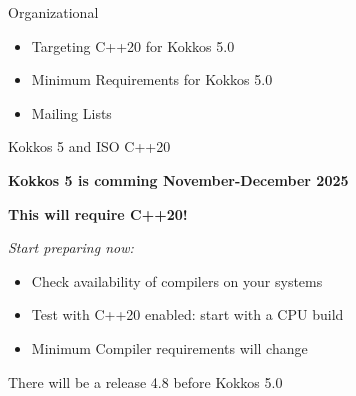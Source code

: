

\begin{frame}[fragile]

  {\Huge Organizational}

  \vspace{15pt}

  \begin{itemize}
    \item Targeting C++20 for Kokkos 5.0
    \item Minimum Requirements for Kokkos 5.0
    \item Mailing Lists
  \end{itemize}

\end{frame}


\begin{frame}[fragile]{Kokkos 5 and ISO C++20}
\begin{center}
\textbf{Kokkos 5 is comming November-December 2025}

\vspace{0.5cm}
\textbf{This will require C++20!}
\end{center}

\textit{Start preparing now:}
\begin{itemize}
  \item{Check availability of compilers on your systems}
  \item{Test with C++20 enabled: start with a CPU build}
  \item{Minimum Compiler requirements will change}
\end{itemize}

\vspace{0.5cm}
There will be a release 4.8 before Kokkos 5.0

\end{frame}


